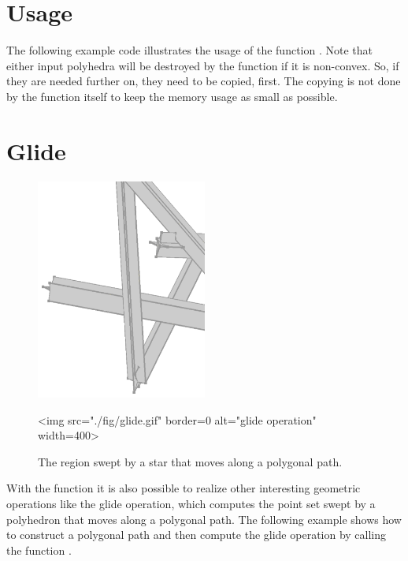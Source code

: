 \section{Usage}

The following example code illustrates the usage of the function
. Note that either input polyhedra will be
destroyed by the function if it is non-convex. So, if they are needed
further on, they need to be copied, first. The copying is not done by
the function itself to keep the memory usage as small as possible.


\section{Glide}

\begin{figure}
  \begin{center}
    \begin{ccTexOnly}
      \includegraphics[width=0.5\textwidth]{Minkowski_sum_3/fig/glide}

  \end{ccTexOnly}
  \begin{ccHtmlOnly}
    <img src="./fig/glide.gif" border=0 alt="glide operation" width=400>
  \end{ccHtmlOnly}
    \end{center}
  \caption{The region swept by a star that moves along a polygonal path.}
\end{figure}

With the function  it is also possible to realize
other interesting geometric operations like the glide operation, which
computes the point set swept by a polyhedron that moves along a
polygonal path. The following example shows how to construct a
polygonal path and then compute the glide operation by calling the
function .

